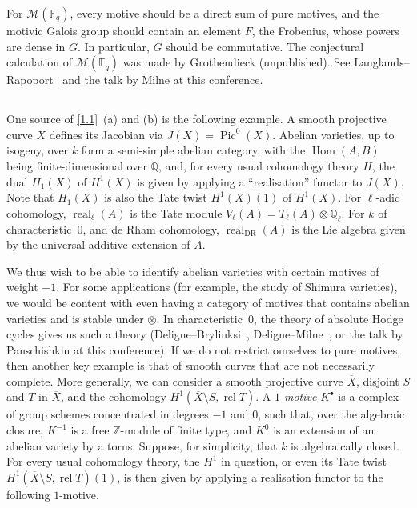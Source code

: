 \documentclass{article}
\theoremstyle{plain}
\theoremstyle{definition}
\newcommand{\sh}{\mathscr}
\newcommand{\ZZ}{\mathbb{Z}}
\newcommand{\QQ}{\mathbb{Q}}
\newcommand{\FF}{\mathbb{F}}
\DeclareMathOperator{\Pic}{Pic}
\DeclareMathOperator{\Hom}{Hom}
\DeclareMathOperator{\real}{real}
\newcommand{\oldpage}[1]{\marginpar{\footnotesize$\Big\vert$ \textit{p.~#1}}}
\begin{document}
For $\sh{M}(\FF_q)$, every motive should be a direct sum of pure motives, and the motivic Galois group should contain an element $F$, the Frobenius, whose powers are dense in $G$.
In particular, $G$ should be commutative.
The conjectural calculation of $\sh{M}(\FF_q)$ was made by Grothendieck (unpublished).
See Langlands--Rapoport~\cite{23} and the talk by Milne at this conference.


\subsection{}
\label{1.5}

One source of \cref{1.1}~(a) and (b) is the following example.
A smooth projective curve $X$ defines its Jacobian via $J(X)=\Pic^0(X)$.
Abelian varieties, up to isogeny, over $k$ form a semi-simple abelian category, with the $\Hom(A,B)$ being finite-dimensional over $\QQ$, and, for every usual cohomology theory $H$, the dual $H_1(X)$ of $H^1(X)$ is given by applying a ``realisation'' functor to $J(X)$.
Note that $H_1(X)$ is also the Tate twist $H^1(X)(1)$ of $H^1(X)$.
For $\ell$-adic cohomology, $\real_\ell(A)$ is the Tate module $V_\ell(A)=T_\ell(A)\otimes\QQ_\ell$.
For $k$ of characteristic~$0$, and
\oldpage{148}
de Rham cohomology, $\real_{\mathrm{DR}}(A)$ is the Lie algebra given by the universal additive extension of $A$.

We thus wish to be able to identify abelian varieties with certain motives of weight $-1$.
For some applications (for example, the study of Shimura varieties), we would be content with even having a category of motives that contains abelian varieties and is stable under $\otimes$.
In characteristic~$0$, the theory of absolute Hodge cycles gives us such a theory (Deligne--Brylinksi~\cite{11}, Deligne--Milne~\cite{12}, or the talk by Panschishkin at this conference).
If we do not restrict ourselves to pure motives, then another key example is that of smooth curves that are not necessarily complete.
More generally, we can consider a smooth projective curve $\overline{X}$, disjoint $S$ and $T$ in $\overline{X}$, and the cohomology $H^1(\overline{X}\setminus S,\operatorname{rel}T)$.
A \emph{$1$-motive} $K^\bullet$ is a complex of group schemes concentrated in degrees $-1$ and $0$, such that, over the algebraic closure, $K^{-1}$ is a free $\ZZ$-module of finite type, and $K^0$ is an extension of an abelian variety by a torus.
Suppose, for simplicity, that $k$ is algebraically closed.
For every usual cohomology theory, the $H^1$ in question, or even its Tate twist $H^1(\overline{X}\setminus S,\operatorname{rel}T)(1)$, is then given by applying a realisation functor to the following $1$-motive.
\end{document}

